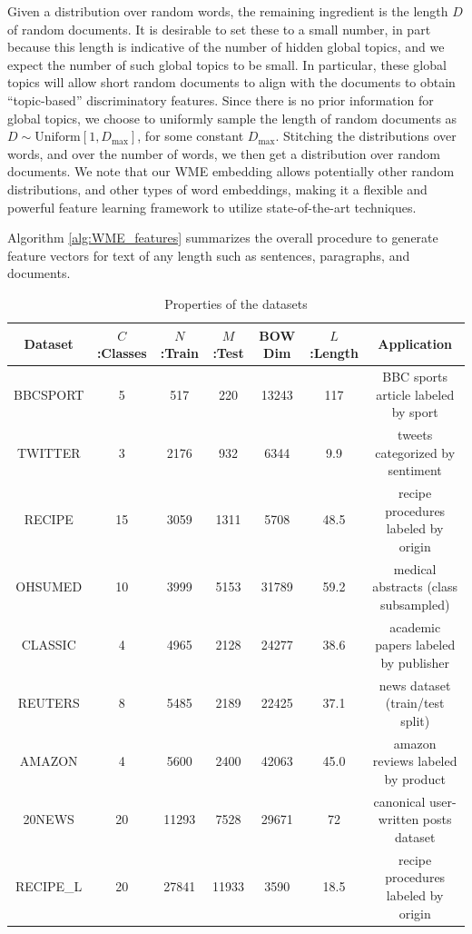 \documentclass[11pt,a4paper]{article}
\newcommand{\1}{\boldsymbol{1}}
\begin{document}
Given a distribution over random words, the remaining ingredient is the length $D$ of random documents. It is desirable to set these to a small number, in part because this length is indicative of the number of hidden global topics, and we expect the number of such global topics to be small. In particular, these global topics will allow short random documents to align with the documents to obtain ``topic-based'' discriminatory features. Since there is no prior information for global topics, we choose to uniformly sample the length of random documents as $D \sim \text{Uniform}[1, D_{\max}]$, for some constant $D_{\max}$. Stitching the distributions over words, and over the number of words, we then get a distribution over random documents. We note that our WME embedding allows potentially other random distributions, and other types of word embeddings, making it a flexible and powerful feature learning framework to utilize state-of-the-art techniques.  


Algorithm \ref{alg:WME_features} summarizes the overall procedure to generate feature vectors for text of any length such as sentences, paragraphs, and documents.

\begin{table}[ht]
\centering
\scriptsize
\caption{Properties of the datasets}
\label{tb:info of datasets}
\vspace{0mm}
\begin{center}
    \begin{tabular}{ c c c c c c c}
    \hline
    Dataset & $C$:Classes & $N$:Train & $M$:Test & BOW Dim & $L$:Length & Application \\ \hline 
    BBCSPORT   & 5 & 517 & 220 & 13243 & 117 & BBC sports article labeled by sport \\ %
    TWITTER	   & 3 & 2176 &	932 & 6344 & 9.9  & tweets categorized by sentiment \\ %
    RECIPE     & 15 & 3059 & 1311	& 5708 & 48.5 & recipe procedures labeled by origin \\ %
    OHSUMED    & 10 & 3999 & 5153 & 31789 & 59.2 & medical abstracts (class subsampled) \\ %
    CLASSIC    & 4 & 4965 & 2128 & 24277 & 38.6 & academic papers labeled by publisher \\ %
    REUTERS   & 8 & 5485 & 2189 & 22425 & 37.1 & news dataset (train/test split) \\ %
    AMAZON     & 4 & 5600 & 2400  & 42063 & 45.0 & amazon reviews labeled by product \\ %
    20NEWS    & 20 & 11293 & 7528 & 29671 & 72 & canonical user-written posts dataset \\ %
    RECIPE\_L & 20 & 27841 & 11933 & 3590 & 18.5 & recipe procedures labeled by origin \\ \hline
    \end{tabular}
\end{center}
\vspace{0mm}
\end{table}
\end{document}
